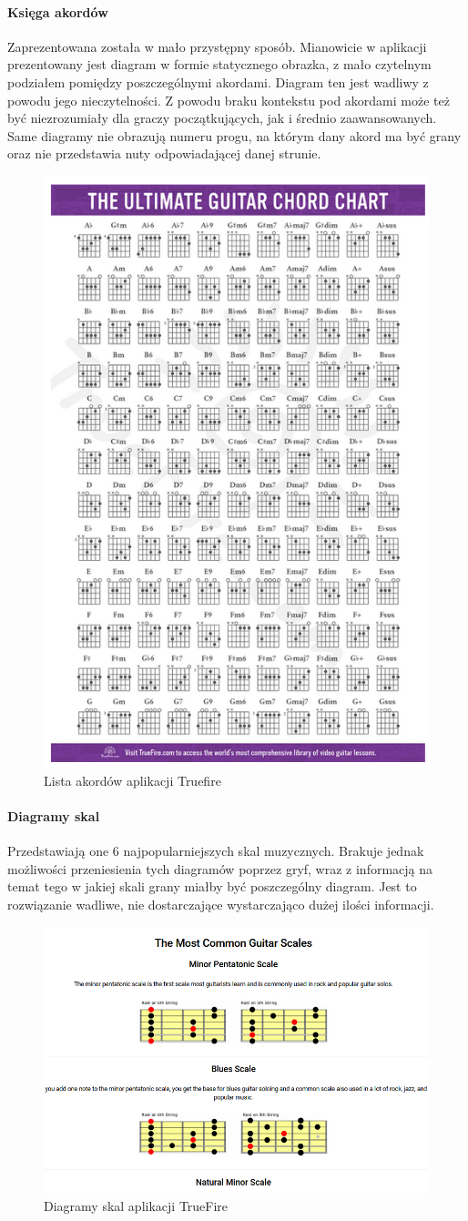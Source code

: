 \paragraph{Księga akordów}
Zaprezentowana została w mało przystępny sposób. Mianowicie w aplikacji prezentowany jest diagram w formie statycznego obrazka, z mało czytelnym podziałem pomiędzy poszczególnymi akordami. Diagram ten jest wadliwy z powodu jego nieczytelności. Z powodu braku kontekstu pod akordami może też być niezrozumiały dla graczy początkujących, jak i średnio zaawansowanych. Same diagramy nie obrazują numeru progu, na którym dany akord ma być grany oraz nie przedstawia nuty odpowiadającej danej strunie.

\begin{figure}[htb]
	\centering
	\includegraphics[width=.4\linewidth]{rys02/ChordChart}
	\caption{Lista akordów aplikacji Truefire} \label{fig:pageLayout}
\end{figure}

\paragraph{Diagramy skal}
Przedstawiają one 6 najpopularniejszych skal muzycznych. Brakuje jednak możliwości przeniesienia tych diagramów poprzez gryf, wraz z informacją na temat tego w jakiej skali grany miałby być poszczególny diagram. Jest to rozwiązanie wadliwe, nie dostarczające wystarczająco dużej ilości informacji. \\

\begin{figure}[htb]
	\centering
	\includegraphics[width=.4\linewidth]{rys02/SKALETF}
	\caption{Diagramy skal aplikacji TrueFire} \label{fig:pageLayout}
\end{figure}

